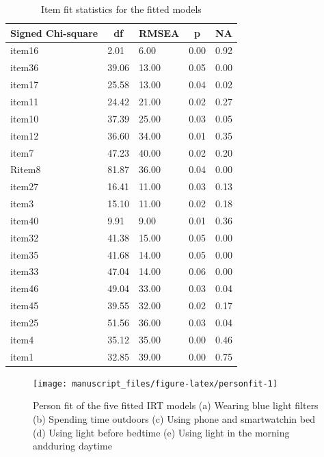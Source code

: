 \documentclass[
  english,
  man]{apa6}
\begin{document}
\begin{table}[tbp]

\begin{center}
\begin{threeparttable}

\caption{\label{tab:itemfittab}Item fit statistics for the fitted models}

\begin{tabular}{lllll}
\toprule
Signed Chi-square & \multicolumn{1}{c}{df} & \multicolumn{1}{c}{RMSEA} & \multicolumn{1}{c}{p} & \multicolumn{1}{c}{NA}\\
\midrule
item16 & 2.01 & 6.00 & 0.00 & 0.92\\
item36 & 39.06 & 13.00 & 0.05 & 0.00\\
item17 & 25.58 & 13.00 & 0.04 & 0.02\\
item11 & 24.42 & 21.00 & 0.02 & 0.27\\
item10 & 37.39 & 25.00 & 0.03 & 0.05\\
item12 & 36.60 & 34.00 & 0.01 & 0.35\\
item7 & 47.23 & 40.00 & 0.02 & 0.20\\
Ritem8 & 81.87 & 36.00 & 0.04 & 0.00\\
item27 & 16.41 & 11.00 & 0.03 & 0.13\\
item3 & 15.10 & 11.00 & 0.02 & 0.18\\
item40 & 9.91 & 9.00 & 0.01 & 0.36\\
item32 & 41.38 & 15.00 & 0.05 & 0.00\\
item35 & 41.68 & 14.00 & 0.05 & 0.00\\
item33 & 47.04 & 14.00 & 0.06 & 0.00\\
item46 & 49.04 & 33.00 & 0.03 & 0.04\\
item45 & 39.55 & 32.00 & 0.02 & 0.17\\
item25 & 51.56 & 36.00 & 0.03 & 0.04\\
item4 & 35.12 & 35.00 & 0.00 & 0.46\\
item1 & 32.85 & 39.00 & 0.00 & 0.75\\
\bottomrule
\end{tabular}

\end{threeparttable}
\end{center}

\end{table}

\begin{figure}
\texttt{[image: manuscript\_files/figure-latex/personfit-1]} \caption{Person fit of the five fitted IRT models (a) Wearing blue light filters (b) Spending time outdoors (c) Using phone and smartwatchin bed (d) Using light before bedtime (e) Using light in the morning andduring daytime}\label{fig:personfit}
\end{figure}
\end{document}
